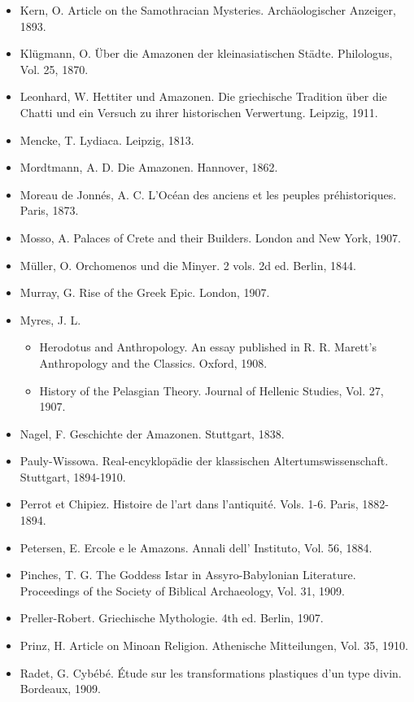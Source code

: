 \documentclass[a4paper, 12pt, oneside]{article}
\begin{document}
\begin{itemize}
    \item Kern, O. Article on the Samothracian Mysteries. Archäologischer Anzeiger, 1893.
    \item Klügmann, O. Über die Amazonen der kleinasiatischen Städte. Philologus, Vol. 25, 1870.
    \item Leonhard, W. Hettiter und Amazonen. Die griechische Tradition über die Chatti und ein Versuch zu ihrer historischen Verwertung. Leipzig, 1911.
    \item Mencke, T. Lydiaca. Leipzig, 1813.
    \item Mordtmann, A. D. Die Amazonen. Hannover, 1862.
    \item Moreau de Jonnés, A. C. L'Océan des anciens et les peuples préhistoriques. Paris, 1873.
    \item Mosso, A. Palaces of Crete and their Builders. London and New York, 1907.
    \item Müller, O. Orchomenos und die Minyer. 2 vols. 2d ed. Berlin, 1844.
    \item Murray, G. Rise of the Greek Epic. London, 1907.
    \item Myres, J. L.
    \begin{itemize}
        \item Herodotus and Anthropology. An essay published in R. R. Marett's Anthropology and the Classics. Oxford, 1908.
        \item History of the Pelasgian Theory. Journal of Hellenic Studies, Vol. 27, 1907.
    \end{itemize}
    \item Nagel, F. Geschichte der Amazonen. Stuttgart, 1838.
    \item Pauly-Wissowa. Real-encyklopädie der klassischen Altertumswissenschaft. Stuttgart, 1894-1910.
    \item Perrot et Chipiez. Histoire de l'art dans l'antiquité. Vols. 1-6. Paris, 1882-1894.
    \item Petersen, E. Ercole e le Amazons. Annali dell' Instituto, Vol. 56, 1884.
    \item Pinches, T. G. The Goddess Istar in Assyro-Babylonian Literature. Proceedings of the Society of Biblical Archaeology, Vol. 31, 1909.
    \item Preller-Robert. Griechische Mythologie. 4th ed. Berlin, 1907.
    \item Prinz, H. Article on Minoan Religion. Athenische Mitteilungen, Vol. 35, 1910.
    \item Radet, G. Cybébé. Étude sur les transformations plastiques d'un type divin. Bordeaux, 1909.

\end{itemize}
\end{document}
